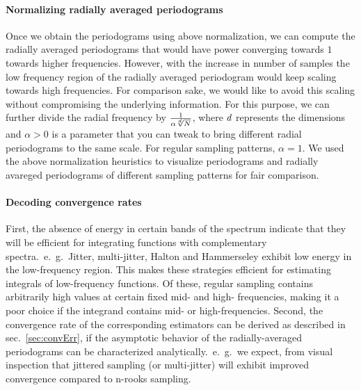 \documentclass[11pt,fleqn]{book} %
\begin{document}
\paragraph{Normalizing radially averaged periodograms} 
Once we obtain the periodograms using above normalization, we can compute the radially averaged periodograms that would have power converging towards $1$ towards higher frequencies. However, with the increase in number of samples the low frequency region of the radially averaged periodogram would keep scaling towards high frequencies. %
For comparison sake, we would like to avoid this scaling without compromising the underlying information. For this purpose, we can further divide the radial frequency by $\frac{1}{\alpha \sqrt[d]{N}}$, where ${d}$ represents the dimensions and $\alpha > 0$ is a parameter that you can tweak to bring different radial periodograms to the same scale. For regular sampling patterns, $\alpha=1$. We used the above normalization heuristics to visualize periodograms and radially avareged periodograms 
of different sampling patterns for fair comparison.

\paragraph{Decoding convergence rates}
First, the absence of energy in certain bands of the spectrum indicate that they will be efficient for integrating functions with complementary spectra.~e.~g.~Jitter, multi-jitter, Halton and Hammerseley exhibit low energy in the low-frequency region. This makes these strategies efficient for estimating integrals of low-frequency functions. Of these, regular sampling contains arbitrarily high values at certain fixed mid- and high- frequencies, making it a poor choice if the integrand contains mid- or high-frequencies. 
Second, the convergence rate of the corresponding estimators can be derived as described in sec.~\ref{sec:convErr}, if the asymptotic behavior of the radially-averaged periodograms can be characterized analytically.~e.~g.~we expect, from visual inspection that jittered sampling (or multi-jitter) will exhibit improved convergence compared to n-rooks sampling. 
\end{document}
